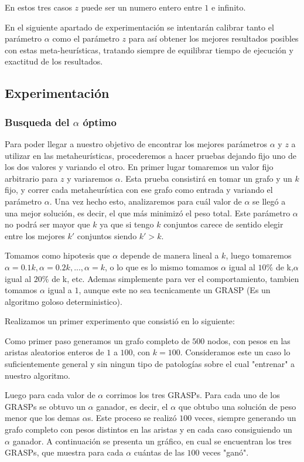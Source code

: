 En estos tres casos $z$ puede ser un numero entero entre $1$ e infinito.

En el siguiente apartado de experimentación se intentarán calibrar tanto el parámetro $\alpha$ como el parámetro $z$ para así obtener los mejores resultados posibles con estas meta-heurísticas, tratando siempre de equilibrar tiempo de ejecución y exactitud de los resultados.

\subsection{Experimentación}

\subsubsection{Busqueda del $\alpha$ óptimo}

Para poder llegar a nuestro objetivo de encontrar los mejores parámetros $\alpha$ y $z$ a utilizar en las metaheurísticas, procederemos a hacer pruebas dejando fijo uno de los dos valores y variando el otro.
En primer lugar tomaremos un valor fijo arbitrario para $z$ y variaremos $\alpha$. Esta prueba consistirá en tomar un grafo y un $k$ fijo, y correr cada metaheurística con ese grafo como entrada y variando el parámetro $\alpha$. Una vez hecho esto, analizaremos para cuál valor de $\alpha$ se llegó a una mejor solución, es decir, el que más minimizó el peso total. Este parámetro $\alpha$ no podrá ser mayor que $k$ ya que si tengo $k$ conjuntos carece de sentido elegir entre los mejores $k'$ conjuntos siendo $k'>k$.

Tomamos como hipotesis que $\alpha$ depende de manera lineal a $k$, luego tomaremos $\alpha = 0.1 k,\alpha = 0.2 k,...,\alpha = k $, o lo que es lo mismo tomamos $\alpha$ igual al $10\%$ de k,$\alpha$ igual al $20\%$ de k, etc. Ademas simplemente para ver el comportamiento, tambien tomamos $\alpha$ igual a $1$, aunque este no sea tecnicamente un GRASP (Es un algoritmo goloso deterministico).

Realizamos un primer experimento que consistió en lo siguiente:

Como primer paso generamos un grafo completo de $500$ nodos, con pesos en las aristas aleatorios enteros de $1$ a $100$, con $k=100$. Consideramos este un caso lo suficientemente general y sin ningun tipo de patologías sobre el cual "entrenar" a nuestro algoritmo.

Luego para cada valor de $\alpha$ corrimos los tres GRASPs. Para cada uno de los GRASPs se obtuvo un $\alpha$ ganador, es decir, el $\alpha$ que obtubo una solución de peso menor que los demas $\alpha$s. Este proceso se realizó $100$ veces, siempre generando un grafo completo con pesos distintos en las aristas y en cada caso consiguiendo un $\alpha$ ganador. A continuación se presenta un gráfico, en cual se encuentran los tres GRASPs, que muestra para cada $\alpha$ cuántas de las $100$ veces "ganó". 

